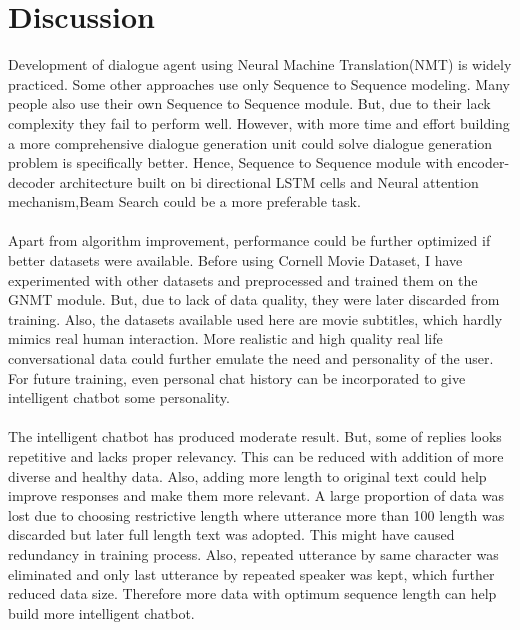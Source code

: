 \documentclass[a4paper,12pt]{report}
\begin{document}
{\let\clearpage\relax \chapter {Discussion}}
\noindent Development of dialogue agent using Neural Machine Translation(NMT) is widely practiced. Some other approaches use only Sequence to Sequence modeling. Many people also use their own Sequence to Sequence module. But, due to their lack complexity they fail to perform well. However, with more time and effort building a more comprehensive dialogue generation unit could solve dialogue generation problem is specifically better. Hence, Sequence to Sequence module with encoder-decoder architecture built on bi directional LSTM cells and Neural attention mechanism,Beam Search could be a more preferable task.\\\\
Apart from algorithm improvement, performance could be further optimized if better datasets were available. Before using Cornell Movie Dataset, I have experimented with other datasets and preprocessed and trained them on the GNMT module. But, due to lack of data quality, they were later discarded from training. Also, the datasets available used here are movie subtitles, which hardly mimics real human interaction. More realistic and high quality real life conversational data could further emulate the need and personality of the user. For future training, even personal chat history can be incorporated to give intelligent chatbot some personality.\\\\
The intelligent chatbot has produced moderate result. But, some of replies looks repetitive and lacks proper relevancy. This can be reduced with addition of more diverse and healthy data. Also, adding more length to original text could help improve responses and make them more relevant. A large proportion of data was lost due to choosing restrictive length where utterance more than 100 length was discarded but later full length text was adopted. This might have caused redundancy in training process. Also, repeated utterance by same character was eliminated and only last utterance by repeated speaker was kept, which further reduced data size. Therefore more data with optimum sequence length can help build more intelligent chatbot.\\\\
\end{document}
